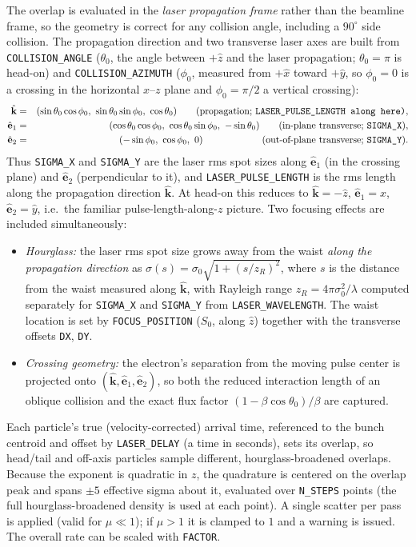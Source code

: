 The overlap is evaluated in the \emph{laser propagation frame} rather than the
beamline frame, so the geometry is correct for any collision angle, including a
$90^\circ$ side collision.  The propagation direction and two transverse laser
axes are built from \verb|COLLISION_ANGLE| ($\theta_0$, the angle between $+\hat z$
and the laser propagation; $\theta_0=\pi$ is head-on) and \verb|COLLISION_AZIMUTH|
($\phi_0$, measured from $+\hat x$ toward $+\hat y$, so $\phi_0=0$ is a crossing in
the horizontal $x$--$z$ plane and $\phi_0=\pi/2$ a vertical crossing):
\begin{eqnarray}
\hat{\mathbf k} &=& (\sin\theta_0\cos\phi_0,\ \sin\theta_0\sin\phi_0,\ \cos\theta_0)
   \qquad\text{(propagation; \tt LASER\_PULSE\_LENGTH along here)},\\
\hat{\mathbf e}_1 &=& (\cos\theta_0\cos\phi_0,\ \cos\theta_0\sin\phi_0,\ -\sin\theta_0)
   \qquad\text{(in-plane transverse; {\tt SIGMA\_X})},\\
\hat{\mathbf e}_2 &=& (-\sin\phi_0,\ \cos\phi_0,\ 0)
   \hspace{6.2em}\text{(out-of-plane transverse; {\tt SIGMA\_Y})}.
\end{eqnarray}
Thus \verb|SIGMA_X| and \verb|SIGMA_Y| are the laser rms spot sizes along
$\hat{\mathbf e}_1$ (in the crossing plane) and $\hat{\mathbf e}_2$ (perpendicular
to it), and \verb|LASER_PULSE_LENGTH| is the rms length along the propagation
direction $\hat{\mathbf k}$.  At head-on this reduces to $\hat{\mathbf k}=-\hat z$,
$\hat{\mathbf e}_1=\hat x$, $\hat{\mathbf e}_2=\hat y$, i.e.\ the familiar
pulse-length-along-$z$ picture.  Two focusing effects are included simultaneously:
\begin{itemize}
\item {\em Hourglass:} the laser rms spot size grows away from the waist
  \emph{along the propagation direction} as
  $\sigma(s)=\sigma_0\sqrt{1+(s/z_R)^2}$, where $s$ is the distance from the waist
  measured along $\hat{\mathbf k}$, with Rayleigh range $z_R = 4\pi\sigma_0^2/\lambda$
  computed separately for \verb|SIGMA_X| and \verb|SIGMA_Y| from
  \verb|LASER_WAVELENGTH|.  The waist location is set by \verb|FOCUS_POSITION|
  ($S_0$, along $\hat z$) together with the transverse offsets \verb|DX|, \verb|DY|.
\item {\em Crossing geometry:} the electron's separation from the moving pulse
  center is projected onto $(\hat{\mathbf k},\hat{\mathbf e}_1,\hat{\mathbf e}_2)$,
  so both the reduced interaction length of an oblique collision and the exact flux
  factor $(1-\beta\cos\theta_0)/\beta$ are captured.
\end{itemize}
Each particle's true (velocity-corrected) arrival time, referenced to the bunch
centroid and offset by \verb|LASER_DELAY| (a time in seconds), sets its overlap,
so head/tail and off-axis particles sample different, hourglass-broadened overlaps.
Because the exponent is quadratic in $z$, the quadrature is centered on the overlap
peak and spans $\pm 5$ effective sigma about it, evaluated over \verb|N_STEPS|
points (the full hourglass-broadened density is used at each point).  A single
scatter per pass is applied (valid for $\mu\ll 1$); if $\mu>1$ it is clamped to $1$
and a warning is issued.  The overall rate can be scaled with \verb|FACTOR|.

